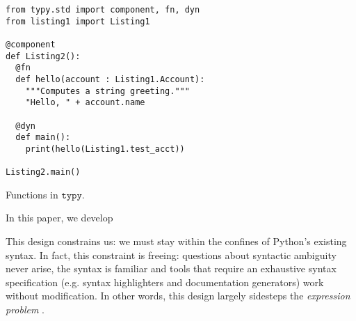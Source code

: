 \documentclass[preprint,10pt]{sigplanconf}
\newcommand{\typy}{\texttt{typy}}
\begin{document}





\begin{codelisting}[t]
\begin{lstlisting}
from typy.std import component, fn, dyn
from listing1 import Listing1

@component
def Listing2():
  @fn
  def hello(account : Listing1.Account):
    """Computes a string greeting."""
    "Hello, " + account.name

  @dyn
  def main():
    print(hello(Listing1.test_acct))

Listing2.main()
\end{lstlisting}
\caption{Functions in $\typy $.}
\end{codelisting}


\newpage
In this paper, we develop 

This design constrains us: we must stay within the confines of Python's existing syntax. In fact, this constraint is freeing: questions about syntactic ambiguity never arise, the syntax is familiar and tools that require an exhaustive syntax specification (e.g. syntax highlighters and documentation generators)  work without modification. In other words, this design largely sidesteps the \emph{expression problem} \cite{wadler1998expression}.%
\end{document}
